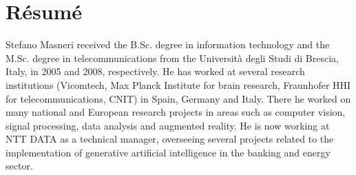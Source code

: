 \chapter{Résumé}

Stefano Masneri received the B.Sc. degree in information technology and the M.Sc. degree in telecommunications from the Università degli Studi di Brescia, Italy, in 2005 and 2008, respectively. He has worked at several research institutions (Vicomtech, Max Planck Institute for brain research, Fraunhofer HHI for telecommunications, CNIT) in Spain, Germany and Italy. There he worked on many national and European research projects in areas such as computer vision, signal processing, data analysis and augmented reality. He is now working at NTT DATA as a technical manager, overseeing several projects related to the implementation of generative artificial intelligence in the banking and energy sector.